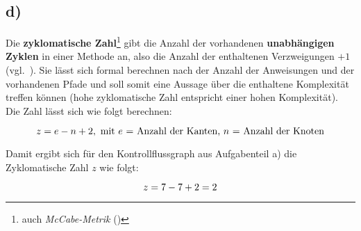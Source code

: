 \subsection*{d)}


Die \textbf{zyklomatische Zahl}\footnote{
    auch \textit{McCabe-Metrik} (\cite{McC76})
} gibt die Anzahl der vorhandenen \textbf{unabhängigen Zyklen} in einer Methode an, also die Anzahl der enthaltenen Verzweigungen $+1$ (vgl.~\cite[38]{Wed09c}).
Sie lässt sich formal berechnen nach der Anzahl der Anweisungen und der vorhandenen Pfade und soll somit eine Aussage über die enthaltene Komplexität treffen können (hohe zyklomatische Zahl entspricht einer hohen Komplexität).\\
Die Zahl lässt sich wie folgt berechnen:

\begin{equation}\notag
    z = e - n + 2, \text{ mit $e$ = Anzahl der Kanten, $n$ = Anzahl der Knoten}
\end{equation}

\noindent
Damit ergibt sich für den Kontrollflussgraph aus Aufgabenteil a) die Zyklomatische Zahl $z$ wie folgt:

\begin{equation}\notag
    z = 7 - 7 + 2 = 2
\end{equation}